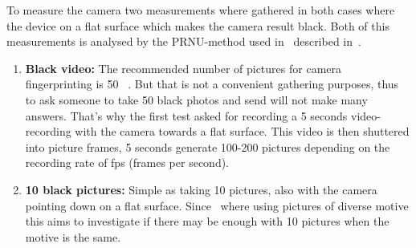 To measure the camera two measurements where gathered in both cases where the device on a flat surface which makes the camera result black. Both of this measurements is analysed by the PRNU-method used in~\cite[]{sensor:camera:DCIdent} described in~.
\begin{enumerate}
  \item \textbf{Black video:} The recommended number of pictures for camera fingerprinting is 50 ~\cite[]{sensor:camera:DCIdent}. But that is not a convenient gathering purposes, thus to ask someone to take 50 black photos and send will not make many answers. That’s why the first test asked for recording a 5 seconds video-recording with the camera towards a flat surface. This video is then shuttered into picture frames, 5 seconds generate 100-200 pictures depending on the recording rate of fps (frames per second).
  \item \textbf{10 black pictures:} Simple as taking 10 pictures, also with the camera pointing down on a flat surface. Since~\cite[]{sensor:camera:DCIdent} where using pictures of diverse motive this aims to investigate if there may be enough with 10 pictures when the motive is the same.
\end{enumerate}

